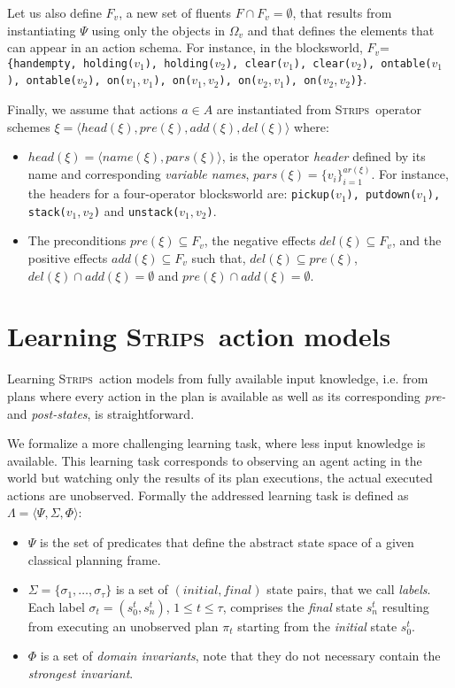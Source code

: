 \documentclass{article}
\newcommand{\tup}[1]{{\langle #1 \rangle}}
\newcommand{\strips}{\textsc{Strips}}     %
\begin{document}
Let us also define $F_v$, a new set of fluents $F\cap F_v=\emptyset$, that results from instantiating $\Psi$ using only the objects in $\Omega_v$ and that defines the elements that can appear in an action schema. For instance, in the blocksworld, $F_v$={\small\tt\{handempty, holding($v_1$), holding($v_2$), clear($v_1$), clear($v_2$), ontable($v_1$), ontable($v_2$), on($v_1,v_1$), on($v_1,v_2$), on($v_2,v_1$), on($v_2,v_2$)\}}.

Finally, we assume that actions $a\in A$ are instantiated from \strips\ operator schemes $\xi=\tup{head(\xi),pre(\xi),add(\xi),del(\xi)}$ where:
\begin{itemize}
\item $head(\xi)=\tup{name(\xi),pars(\xi)}$, is the operator {\em header} defined by its name and corresponding {\em variable names}, $pars(\xi)=\{v_i\}_{i=1}^{ar(\xi)}$. For instance, the headers for a four-operator blocksworld are: {\small\tt pickup($v_1$), putdown($v_1$), stack($v_1,v_2$)} and {\small\tt unstack($v_1,v_2$)}.
\item The preconditions $pre(\xi)\subseteq F_v$, the negative effects $del(\xi)\subseteq F_v$, and the positive effects $add(\xi)\subseteq F_v$ such that, $del(\xi)\subseteq pre(\xi)$, $del(\xi)\cap add(\xi)=\emptyset$ and $pre(\xi)\cap add(\xi)=\emptyset$.
\end{itemize}


\section{Learning \strips\ action models}
Learning \strips\ action models from fully available input knowledge, i.e. from plans where every action in the plan is available as well as its corresponding {\em pre-} and {\em post-states}, is straightforward. %

We formalize a more challenging learning task, where less input knowledge is available. This learning task corresponds to observing an agent acting in the world but watching only the results of its plan executions, the actual executed actions are unobserved. Formally the addressed learning task is defined as $\Lambda=\tup{\Psi,\Sigma,\Phi}$:
\begin{itemize}
\item $\Psi$ is the set of predicates that define the abstract state space of a given classical planning frame.
\item $\Sigma=\{\sigma_1,\ldots,\sigma_{\tau}\}$ is a set of $(initial, final)$ state pairs, that we call {\em labels}. Each label $\sigma_t=(s_0^t,s_{n}^t)$, {\tt\small $1\leq t\leq \tau$}, comprises the {\em final} state $s_{n}^t$ resulting from executing an unobserved plan $\pi_t$ starting from the {\em initial} state $s_0^t$.
\item $\Phi$ is a set of {\em domain invariants}, note that they do not necessary contain the {\em strongest invariant}.
\end{itemize}
\end{document}
